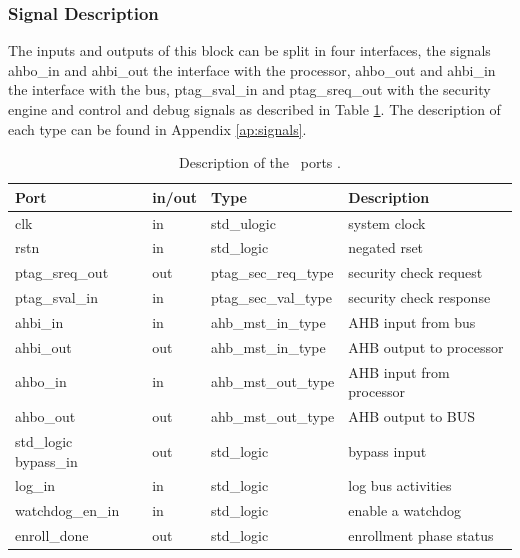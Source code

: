 \subsubsection{Signal Description}

The inputs and outputs of this block can be split in four interfaces,
the signals  ahbo\_in and ahbi\_out the interface with the processor,  ahbo\_out  and ahbi\_in
the interface with the bus, ptag\_sval\_in and ptag\_sreq\_out with the security engine and control and debug signals as described in Table \ref{table:shports}.
 The description of each type can be found in Appendix \ref{ap:signals}.

\begin{table}[H]
\begin{tabular}{l l l l}
\textbf{Port}   & \textbf{in/out} & \textbf{Type}        & \textbf{Description} 	\\ \hline \hline
clk             & in              & std\_ulogic          & system clock         	\\ \hline
rstn            & in              & std\_logic           & negated rset         	\\ \hline
ptag\_sreq\_out & out             & ptag\_sec\_req\_type & security check request    	\\ \hline
ptag\_sval\_in  & in              & ptag\_sec\_val\_type & security check response  	\\ \hline
ahbi\_in        & in              & ahb\_mst\_in\_type   & AHB input from bus      	\\ \hline
ahbi\_out       & out             & ahb\_mst\_in\_type   & AHB output to processor      \\ \hline
ahbo\_in        & in              & ahb\_mst\_out\_type  & AHB input from processor    \\ \hline
ahbo\_out       & out             & ahb\_mst\_out\_type  & AHB output to BUS            \\ \hline
std\_logic         
bypass\_in      & out             & std\_logic           & bypass input         	\\ \hline
log\_in         & in              & std\_logic           & log bus activities       \\ \hline
watchdog\_en\_in  & in            & std\_logic           & enable a watchdog             \\ \hline
enroll\_done     & out             & std\_logic          & enrollment phase status            \\ \hline

\end{tabular}
 \caption{Description of the \handler~ports .}
 \label{table:shports}

\end{table}

